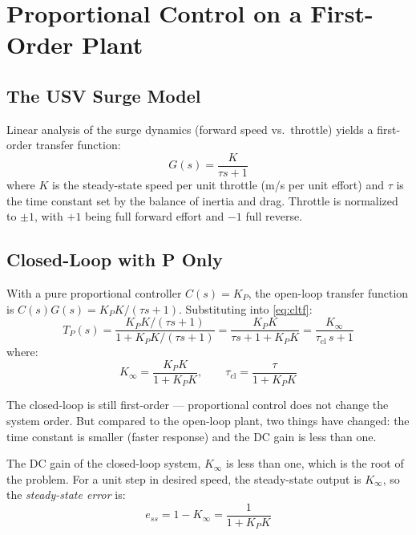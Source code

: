 \documentclass[12pt]{article}
\begin{document}
\section{Proportional Control on a First-Order Plant}
\label{sec:pcontrol}

\subsection{The USV Surge Model}

Linear analysis of the surge dynamics (forward speed vs.\ throttle) yields a
first-order transfer function:
\begin{equation}
  G(s) = \frac{K}{\tau s + 1}
  \label{eq:surge_plant}
\end{equation}
where $K$ is the steady-state speed per unit throttle (m/s per unit effort)
and $\tau$ is the time constant set by the balance of inertia and drag.
Throttle is normalized to $\pm 1$, with $+1$ being full forward effort and
$-1$ full reverse.

\subsection{Closed-Loop with P Only}

With a pure proportional controller $C(s) = K_P$, the open-loop transfer
function is $C(s)G(s) = K_P K/(\tau s + 1)$.  Substituting into
\cref{eq:cltf}:
\begin{equation}
  T_P(s) = \frac{K_P K/(\tau s+1)}{1 + K_P K/(\tau s+1)}
          = \frac{K_P K}{\tau s + 1 + K_P K}
          = \frac{K_\infty}{\tau_\mathrm{cl}\,s + 1}
  \label{eq:cl_p}
\end{equation}
where:
\begin{equation}
  K_\infty = \frac{K_P K}{1 + K_P K}, \qquad
  \tau_\mathrm{cl} = \frac{\tau}{1 + K_P K}
  \label{eq:p_params}
\end{equation}

The closed-loop is still first-order --- proportional control does not change
the system order.  But compared to the open-loop plant, two things have
changed: the time constant is smaller (faster response) and the DC gain is
less than one.

The DC gain of the closed-loop system, $K_\infty$ is less than one, which is the root of the problem.  For a unit step in
desired speed, the steady-state output is $K_\infty$, so the
\emph{steady-state error} is:
\begin{equation}
  e_{ss} = 1 - K_\infty = \frac{1}{1 + K_P K}
  \label{eq:p_error}
\end{equation}
\end{document}
